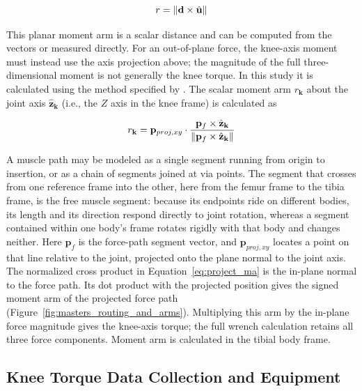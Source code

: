 \begin{equation}
    r = \lVert\mathbf{d} \times \hat{\mathbf{u}}\rVert
    \label{eq:momentarm_def}
\end{equation}

This planar moment arm is a scalar distance and can be computed from the vectors or measured directly. For an out-of-plane force, the knee-axis moment must instead use the axis projection above; the magnitude of the full three-dimensional moment is not generally the knee torque. In this study it is calculated using the method specified by \citet{young_analyzing_2019}. The scalar moment arm $r_{\mathbf{k}}$ about the joint axis $\hat{\mathbf{z}}_{\mathbf{k}}$ (i.e., the $Z$ axis in the knee frame) is calculated as 

\begin{equation}
    r_{\mathbf{k}} = \mathbf{p}_{proj,xy} \cdot \frac{\mathbf{p}_{f} \times \hat{\mathbf{z}}_{\mathbf{k}}} { \lVert\mathbf{p}_{f} \times \hat{\mathbf{z}}_{\mathbf{k}}\rVert } \label{eq:project_ma}
\end{equation}

A muscle path may be modeled as a single segment running from origin to insertion, or as a chain of segments joined at via points. The segment that crosses from one reference frame into the other, here from the femur frame to the tibia frame, is the free muscle segment: because its endpoints ride on different bodies, its length and its direction respond directly to joint rotation, whereas a segment contained within one body's frame rotates rigidly with that body and changes neither. Here $\mathbf{p}_{f}$ is the force-path segment vector, and $\mathbf{p}_{proj,xy}$ locates a point on that line relative to the joint, projected onto the plane normal to the joint axis. The normalized cross product in Equation~\eqref{eq:project_ma} is the in-plane normal to the force path. Its dot product with the projected position gives the signed moment arm of the projected force path (Figure~\ref{fig:masters_routing_and_arms}). Multiplying this arm by the in-plane force magnitude gives the knee-axis torque; the full wrench calculation retains all three force components. Moment arm is calculated in the tibial body frame.



\subsection{Knee Torque Data Collection and Equipment}\label{sec:torque_equipment}


